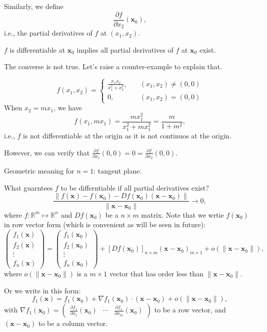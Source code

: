 Similarly, we define
\[
\frac{\partial f}{\partial x_2}(\bm x_0),
\]
i.e., the partial derivatives of $f$ at $(x_1,x_2)$.
\begin{corollary}\label{Cor:9:1}
$f$ is differentiable at $\bm x_0$ implies all partial derivatives of $f$ at $\bm x_0$ exist.
\end{corollary}
The converse is not true. Let's raise a counter-example to explain that.
\begin{example}
\[
f(x_1,x_2)=\left\{
\begin{aligned}
\frac{x_1x_2}{x_1^2+x_2^2},&\quad (x_1,x_2)\ne(0,0)\\
0,&\quad (x_1,x_2)=(0,0)
\end{aligned}
\right.
\]
When $x_2=mx_1$, we have
\[
f(x_1,mx_1) = \frac{mx_1^2}{x_1^2+mx_1^2}=\frac{m}{1+m^2},
\]
i.e., $f$ is not differentiable at the origin as it is not continuos at the origin.

However, we can verify that $\frac{\partial f}{\partial x_1}(0,0)=0=\frac{\partial f}{\partial x_2}(0,0)$.

\end{example}
Geometric meaning for $n=1$: tangent plane.

What guarntees $f$ to be differntiable if all partial derivatives exist?
\[
\frac{\|f(\bm x) - f(\bm x_0) - Df(\bm x_0)(\bm x-\bm x_0)\|}{\|\bm x-\bm x_0\|}\to0,
\]
where $f:\mathbb{R}^m\mapsto\mathbb{R}^n$ and $Df(\bm x_0)$ be a $n\times m$ matrix. Note that we wrtie $f(\bm x_0)$ in row vector form (which is convenient as will be seen in future):
\[
\begin{pmatrix}
f_1(\bm x)\\
f_2(\bm x)\\
\vdots\\
f_n(\bm x)
\end{pmatrix}=
\begin{pmatrix}
f_1(\bm x_0)\\
f_2(\bm x_0)\\
\vdots\\
f_n(\bm x_0)
\end{pmatrix}
+[{Df(\bm x_0)}]_{n\times m}(\bm x-\bm x_0)_{m\times 1}
+o(\|\bm x-\bm x_0\|),
\]
where $o(\|\bm x-\bm x_0\|)$ is a $m\times 1$ vector that has order less than $\|\bm x-\bm x_0\|$.

Or we write in this form:
\[
f_1(\bm x)=f_1(\bm x_0)+\nabla f_1(\bm x_0)\cdot (\bm x-\bm x_0)+o(\|\bm x-\bm x_0\|),
\]
with $\nabla f_1(\bm x_0) = \begin{pmatrix}
\frac{\partial f_1}{\partial x_1}(\bm x_0)
&
\cdots
&
\frac{\partial f_1}{\partial x_m}(\bm x_0)
\end{pmatrix}$ to be a row vector, and $(\bm x-\bm x_0)$ to be a column vector.

